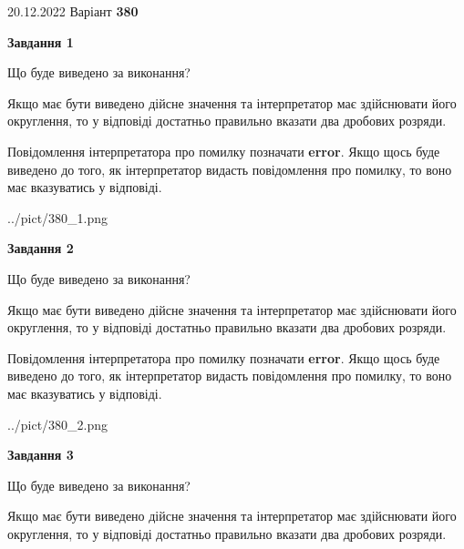 \documentclass[12pt, ukrainian]{article}
\begin{document}
{20.12.2022 Варіант \No \textbf { 380 }\par}
{
\begin {Large}

{\begin {center}\textbf{Завдання 1}\end {center}}\par
Що буде виведено за виконання? \par

Якщо має бути виведено дійсне значення та інтерпретатор має здійснювати його округлення, 
то у відповіді достатньо правильно вказати два дробових розряди.

Повідомлення інтерпретатора про помилку позначати \textbf{error}.
Якщо щось буде виведено до того, як інтерпретатор видасть повідомлення про помилку, 
то воно має вказуватись у відповіді. \par

\begin{center}
	{../pict/380_1.png}
\end{center}
\newpage

{\begin {center}\textbf{Завдання 2}\end {center}}\par
Що буде виведено за виконання? \par

Якщо має бути виведено дійсне значення та інтерпретатор має здійснювати його округлення, 
то у відповіді достатньо правильно вказати два дробових розряди.

Повідомлення інтерпретатора про помилку позначати \textbf{error}.
Якщо щось буде виведено до того, як інтерпретатор видасть повідомлення про помилку, 
то воно має вказуватись у відповіді. \par

\begin{center}
	{../pict/380_2.png}
\end{center}
\newpage

{\begin {center}\textbf{Завдання 3}\end {center}}\par
Що буде виведено за виконання? \par

Якщо має бути виведено дійсне значення та інтерпретатор має здійснювати його округлення, 
то у відповіді достатньо правильно вказати два дробових розряди.


\end{Large}}
\end{document}
